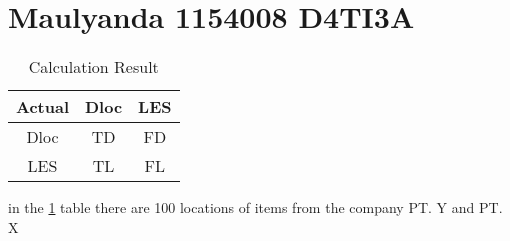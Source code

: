 \section{Maulyanda 1154008 D4TI3A}
\begin{table}[h]
    \centering
    \begin{tabular}{ccc}
    \hline
        Actual & Dloc & LES  \\
    \hline
         Dloc & TD & FD \\
         LES & TL & FL \\
    \hline
    \end{tabular}
    \caption{Calculation Result}
    \label{table1}
\end{table}

\par
in the \ref{table1} table there are 100 locations of items from the company PT. Y and PT. X

